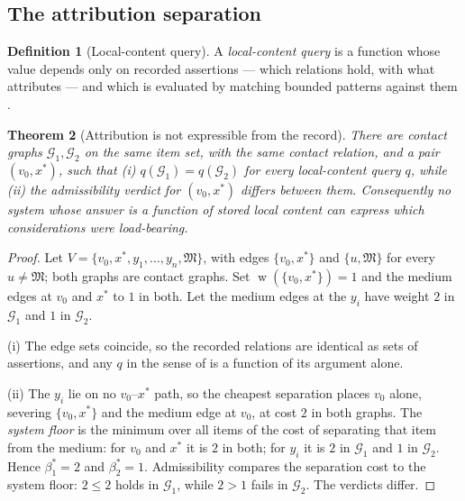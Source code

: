 \documentclass[11pt,a4paper]{article}
\theoremstyle{clstyle}
\newtheorem{theorem}{Theorem}[section]
\theoremstyle{definition}
\newtheorem{definition}[theorem]{Definition}
\theoremstyle{remark}
\DeclareMathOperator{\wt}{w}
\newcommand{\Gph}{\mathcal{G}}
\newcommand{\V}{V}
\newcommand{\flo}{\beta}
\begin{document}
\subsection{The attribution separation}

\begin{definition}[Local-content query]
\label{def:local-query}
A \emph{local-content query} is a function whose value depends only on
recorded assertions --- which relations hold, with what attributes --- and
which is evaluated by matching bounded patterns against them
\citep{chandramerlin1977optimal,perez2009semantics,angles2017foundations}.
\end{definition}

\begin{theorem}[Attribution is not expressible from the record]
\label{thm:attribution}
There are contact graphs $\Gph_1,\Gph_2$ on the same item set, with the same
contact relation, and a pair $(v_0,x^{*})$, such that \textup{(i)}
$q(\Gph_1)=q(\Gph_2)$ for every local-content query $q$, while \textup{(ii)}
the admissibility verdict for $(v_0,x^{*})$ differs between them.
Consequently no system whose answer is a function of stored local content can
express which considerations were load-bearing.
\end{theorem}

\begin{proof}
Let $\V=\{v_0,x^{*},y_1,\dots,y_n,\mathfrak{M}\}$, with edges
$\{v_0,x^{*}\}$ and $\{u,\mathfrak{M}\}$ for every $u\neq\mathfrak{M}$; both
graphs are contact graphs. Set $\wt(\{v_0,x^{*}\})=1$ and the medium edges at
$v_0$ and $x^{*}$ to $1$ in both. Let the medium edges at the $y_i$ have
weight $2$ in $\Gph_1$ and $1$ in $\Gph_2$.

(i) The edge sets coincide, so the recorded relations are identical as sets
of assertions, and any $q$ in the sense of  is a
function of its argument alone.

(ii) The $y_i$ lie on no $v_0$--$x^{*}$ path, so the cheapest separation
places $v_0$ alone, severing $\{v_0,x^{*}\}$ and the medium edge at $v_0$, at
cost $2$ in both graphs. The \emph{system floor} is the minimum over all
items of the cost of separating that item from the medium: for
$v_0$ and $x^{*}$ it is $2$ in both; for $y_i$ it is $2$ in $\Gph_1$ and $1$
in $\Gph_2$. Hence $\flo^{*}_1=2$ and $\flo^{*}_2=1$. Admissibility compares
the separation cost to the system floor: $2\le2$ holds in $\Gph_1$, while
$2>1$ fails in $\Gph_2$. The verdicts differ.
\end{proof}
\end{document}
